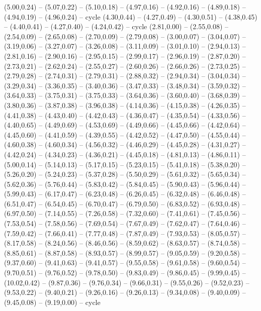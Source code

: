 \expandafter\def\csname geo:gebiet:ATA\endcsname{
  (5.00,0.24) -- (5.07,0.22) -- (5.10,0.18) -- (4.97,0.16) -- (4.92,0.16) -- (4.89,0.18) -- (4.94,0.19) -- (4.96,0.24) -- cycle
  (4.30,0.44) -- (4.27,0.49) -- (4.30,0.51) -- (4.38,0.45) -- (4.40,0.41) -- (4.27,0.40) -- (4.24,0.42) -- cycle
  (2.81,0.00) -- (2.55,0.08) -- (2.54,0.09) -- (2.65,0.08) -- (2.70,0.09) -- (2.79,0.08) -- (3.00,0.07) -- (3.04,0.07) -- (3.19,0.06) -- (3.27,0.07) -- (3.26,0.08) -- (3.11,0.09) -- (3.01,0.10) -- (2.94,0.13) -- (2.81,0.16) -- (2.90,0.16) -- (2.95,0.15) -- (2.99,0.17) -- (2.96,0.19) -- (2.87,0.20) -- (2.73,0.21) -- (2.62,0.24) -- (2.55,0.27) -- (2.60,0.26) -- (2.66,0.26) -- (2.73,0.25) -- (2.79,0.28) -- (2.74,0.31) -- (2.79,0.31) -- (2.88,0.32) -- (2.94,0.34) -- (3.04,0.34) -- (3.29,0.34) -- (3.36,0.35) -- (3.40,0.36) -- (3.47,0.33) -- (3.48,0.34) -- (3.59,0.32) -- (3.64,0.33) -- (3.75,0.31) -- (3.75,0.33) -- (3.64,0.36) -- (3.60,0.40) -- (3.68,0.39) -- (3.80,0.36) -- (3.87,0.38) -- (3.96,0.38) -- (4.14,0.36) -- (4.15,0.38) -- (4.26,0.35) -- (4.41,0.38) -- (4.43,0.40) -- (4.42,0.43) -- (4.36,0.47) -- (4.35,0.54) -- (4.33,0.56) -- (4.40,0.65) -- (4.49,0.69) -- (4.53,0.69) -- (4.49,0.66) -- (4.45,0.66) -- (4.42,0.64) -- (4.45,0.60) -- (4.41,0.59) -- (4.39,0.55) -- (4.42,0.52) -- (4.47,0.50) -- (4.55,0.44) -- (4.60,0.38) -- (4.60,0.34) -- (4.56,0.32) -- (4.46,0.29) -- (4.45,0.28) -- (4.31,0.27) -- (4.42,0.24) -- (4.34,0.23) -- (4.36,0.21) -- (4.45,0.18) -- (4.81,0.13) -- (4.86,0.11) -- (5.00,0.14) -- (5.14,0.13) -- (5.17,0.15) -- (5.23,0.15) -- (5.41,0.18) -- (5.38,0.20) -- (5.26,0.20) -- (5.24,0.23) -- (5.37,0.28) -- (5.50,0.29) -- (5.61,0.32) -- (5.65,0.34) -- (5.62,0.36) -- (5.76,0.44) -- (5.83,0.42) -- (5.84,0.45) -- (5.90,0.43) -- (5.96,0.44) -- (5.99,0.43) -- (6.17,0.47) -- (6.23,0.48) -- (6.26,0.45) -- (6.32,0.48) -- (6.46,0.48) -- (6.51,0.47) -- (6.54,0.45) -- (6.70,0.47) -- (6.79,0.50) -- (6.83,0.52) -- (6.93,0.48) -- (6.97,0.50) -- (7.14,0.55) -- (7.26,0.58) -- (7.32,0.60) -- (7.41,0.61) -- (7.45,0.56) -- (7.53,0.54) -- (7.58,0.56) -- (7.69,0.54) -- (7.67,0.49) -- (7.62,0.47) -- (7.64,0.46) -- (7.59,0.42) -- (7.66,0.41) -- (7.77,0.48) -- (7.87,0.49) -- (7.93,0.53) -- (8.05,0.57) -- (8.17,0.58) -- (8.24,0.56) -- (8.46,0.56) -- (8.59,0.62) -- (8.63,0.57) -- (8.74,0.58) -- (8.85,0.61) -- (8.87,0.58) -- (8.93,0.57) -- (8.99,0.57) -- (9.05,0.59) -- (9.20,0.58) -- (9.37,0.60) -- (9.41,0.63) -- (9.41,0.57) -- (9.55,0.58) -- (9.61,0.58) -- (9.60,0.54) -- (9.70,0.51) -- (9.76,0.52) -- (9.78,0.50) -- (9.83,0.49) -- (9.86,0.45) -- (9.99,0.45) -- (10.02,0.42) -- (9.87,0.36) -- (9.76,0.34) -- (9.66,0.31) -- (9.55,0.26) -- (9.52,0.23) -- (9.53,0.22) -- (9.40,0.21) -- (9.26,0.16) -- (9.26,0.13) -- (9.34,0.08) -- (9.40,0.09) -- (9.45,0.08) -- (9.19,0.00) -- cycle}
